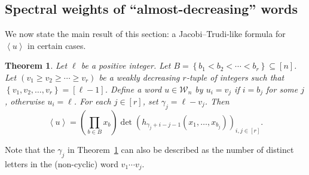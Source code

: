 \documentclass[reqno]{amsart}
\newcommand{\0}{\phantom{c}}
\newcommand{\swt}[1]{\left\langle #1 \right\rangle} %
\newcommand{\mcW}{\mathcal{W}}
\let\prodnonlimits\prod
\renewcommand{\prod}{\prodnonlimits\limits}
\newcommand{\set}[1]{\left\{ #1 \right\}}
\newcommand{\tup}[1]{\left( #1 \right)}
\newcommand{\ive}[1]{\left[ #1 \right]}
\theoremstyle{plain}
\newtheorem{thm}{Theorem}[section]
\theoremstyle{definition}
\numberwithin{equation}{section}
\begin{document}
\subsection{Spectral weights of ``almost-decreasing'' words}

We now state the main result of this section: a Jacobi--Trudi-like formula for $\swt{u}$ in certain cases.

\begin{thm}
\label{thm:determinant_form}
Let $\ell$ be a positive integer.
Let $B = \set{ b_1 < b_2 < \cdots < b_r} \subseteq \ive{n}$.
Let $\tup{v_1 \geq v_2 \geq \cdots \geq v_r}$ be a weakly decreasing $r$-tuple of integers such that $\set{v_1, v_2, \ldots, v_r} = \ive{\ell-1}$.
Define a word $u \in \mcW_n$ by $u_i=v_j$ if $i = b_j$ for some $j$, otherwise $u_i = \ell$.
For each $j \in \ive{r}$, set $\gamma_j = \ell - v_j$.
Then
\[
\swt{u} = \left(  \prod_{b \in B} x_b \right)  \det \left(  h_{\gamma_j+i-j-1}(x_1,\dotsc,x_{b_j}) \right)_{i, j \in \ive{r}}.
\]
\end{thm}

Note that the $\gamma_j$ in Theorem~\ref{thm:determinant_form} can also be described as the number of distinct letters in the (non-cyclic) word $v_1 \dotsm v_j$.
\end{document}
